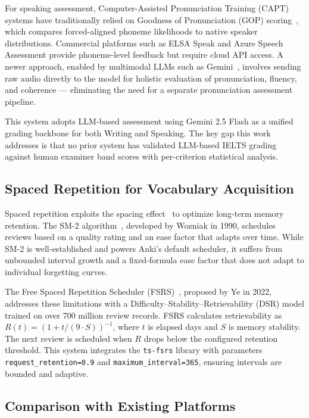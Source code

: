 \documentclass[conference]{IEEEtran}
\begin{document}
For speaking assessment, Computer-Assisted Pronunciation Training (CAPT) systems have traditionally relied on Goodness of Pronunciation (GOP) scoring~\cite{gop_scoring}, which compares forced-aligned phoneme likelihoods to native speaker distributions. Commercial platforms such as ELSA Speak and Azure Speech Assessment provide phoneme-level feedback but require cloud API access. A newer approach, enabled by multimodal LLMs such as Gemini~\cite{gemini}, involves sending raw audio directly to the model for holistic evaluation of pronunciation, fluency, and coherence --- eliminating the need for a separate pronunciation assessment pipeline.

This system adopts LLM-based assessment using Gemini 2.5 Flash as a unified grading backbone for both Writing and Speaking. The key gap this work addresses is that no prior system has validated LLM-based IELTS grading against human examiner band scores with per-criterion statistical analysis.

\subsection{Spaced Repetition for Vocabulary Acquisition}

Spaced repetition exploits the spacing effect~\cite{ebbinghaus} to optimize long-term memory retention. The SM-2 algorithm~\cite{sm2}, developed by Wozniak in 1990, schedules reviews based on a quality rating and an ease factor that adapts over time. While SM-2 is well-established and powers Anki's default scheduler, it suffers from unbounded interval growth and a fixed-formula ease factor that does not adapt to individual forgetting curves.

The Free Spaced Repetition Scheduler (FSRS)~\cite{fsrs}, proposed by Ye in 2022, addresses these limitations with a Difficulty--Stability--Retrievability (DSR) model trained on over 700 million review records. FSRS calculates retrievability as $R(t) = (1 + t/(9 \cdot S))^{-1}$, where $t$ is elapsed days and $S$ is memory stability. The next review is scheduled when $R$ drops below the configured retention threshold. This system integrates the \texttt{ts-fsrs} library with parameters \texttt{request\_retention=0.9} and \texttt{maximum\_interval=365}, ensuring intervals are bounded and adaptive.

\subsection{Comparison with Existing Platforms}
\end{document}
